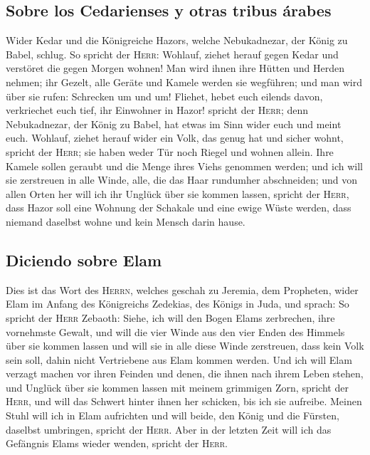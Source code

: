 \hypertarget{sobre-los-cedarienses-y-otras-tribus-uxe1rabes}{%
\subsection{Sobre los Cedarienses y otras tribus
árabes}\label{sobre-los-cedarienses-y-otras-tribus-uxe1rabes}}

 Wider Kedar und die Königreiche Hazors, welche
Nebukadnezar, der König zu Babel, schlug. So spricht der \textsc{Herr}:
Wohlauf, ziehet herauf gegen Kedar und verstöret die gegen Morgen
wohnen!  Man wird ihnen ihre Hütten und Herden nehmen;
ihr Gezelt, alle Geräte und Kamele werden sie wegführen; und man wird
über sie rufen: Schrecken um und um!  Fliehet, hebet euch
eilends davon, verkriechet euch tief, ihr Einwohner in Hazor! spricht
der \textsc{Herr}; denn Nebukadnezar, der König zu Babel, hat etwas im
Sinn wider euch und meint euch.  Wohlauf, ziehet herauf
wider ein Volk, das genug hat und sicher wohnt, spricht der
\textsc{Herr}; sie haben weder Tür noch Riegel und wohnen allein.
 Ihre Kamele sollen geraubt und die Menge ihres Viehs
genommen werden; und ich will sie zerstreuen in alle Winde, alle, die
das Haar rundumher abschneiden; und von allen Orten her will ich ihr
Unglück über sie kommen lassen, spricht der \textsc{Herr},
 dass Hazor soll eine Wohnung der Schakale und eine ewige
Wüste werden, dass niemand daselbst wohne und kein Mensch darin hause.

\hypertarget{diciendo-sobre-elam}{%
\subsection{Diciendo sobre Elam}\label{diciendo-sobre-elam}}

 Dies ist das Wort des \textsc{Herrn}, welches geschah zu
Jeremia, dem Propheten, wider Elam im Anfang des Königreichs Zedekias,
des Königs in Juda, und sprach:  So spricht der
\textsc{Herr} Zebaoth: Siehe, ich will den Bogen Elams zerbrechen, ihre
vornehmste Gewalt,  und will die vier Winde aus den vier
Enden des Himmels über sie kommen lassen und will sie in alle diese
Winde zerstreuen, dass kein Volk sein soll, dahin nicht Vertriebene aus
Elam kommen werden.  Und ich will Elam verzagt machen vor
ihren Feinden und denen, die ihnen nach ihrem Leben stehen, und Unglück
über sie kommen lassen mit meinem grimmigen Zorn, spricht der
\textsc{Herr}, und will das Schwert hinter ihnen her schicken, bis ich
sie aufreibe.  Meinen Stuhl will ich in Elam aufrichten
und will beide, den König und die Fürsten, daselbst umbringen, spricht
der \textsc{Herr}.  Aber in der letzten Zeit will ich das
Gefängnis Elams wieder wenden, spricht der \textsc{Herr}.

